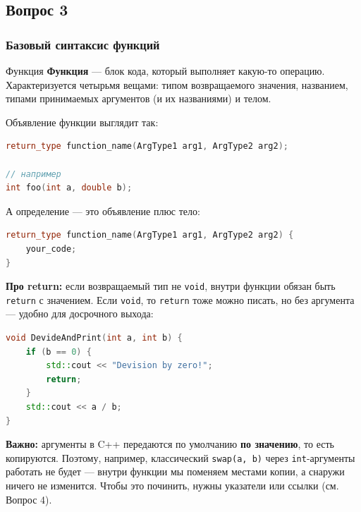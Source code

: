 \subsection{Вопрос 3}
\subsubsection{Базовый синтаксис функций}
\begin{definition}{Функция}{}
\textbf{Функция} --- блок кода, который выполняет какую-то операцию. Характеризуется четырьмя вещами: типом возвращаемого значения, названием, типами принимаемых аргументов (и их названиями) и телом.
\end{definition}
Объявление функции выглядит так:
\begin{lstlisting}[language=C++]
return_type function_name(ArgType1 arg1, ArgType2 arg2);

// например
int foo(int a, double b);
\end{lstlisting}
А определение --- это объявление плюс тело:
\begin{lstlisting}[language=C++]
return_type function_name(ArgType1 arg1, ArgType2 arg2) {
    your_code;
}
\end{lstlisting}
\textbf{Про return:} если возвращаемый тип не \texttt{void}, внутри функции обязан быть \texttt{return} с значением. Если \texttt{void}, то \texttt{return} тоже можно писать, но без аргумента --- удобно для досрочного выхода:
\begin{lstlisting}[language=C++]
void DevideAndPrint(int a, int b) {
    if (b == 0) {
        std::cout << "Devision by zero!";
        return;
    }
    std::cout << a / b;
}
\end{lstlisting}
\textbf{Важно:} аргументы в C++ передаются по умолчанию \textbf{по значению}, то есть копируются. Поэтому, например, классический \texttt{swap(a, b)} через \texttt{int}-аргументы работать не будет --- внутри функции мы поменяем местами копии, а снаружи ничего не изменится. Чтобы это починить, нужны указатели или ссылки (см. Вопрос 4).
